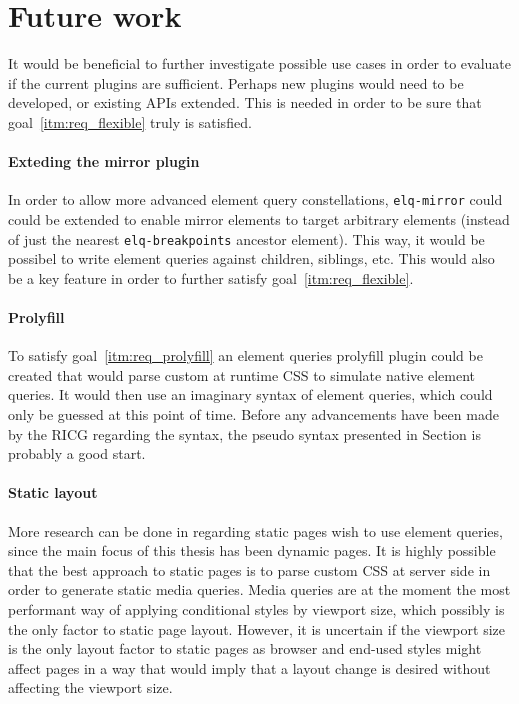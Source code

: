 \documentclass[a4paper,11pt]{kth-mag}
\newcommand{\code}[1]{\texttt{#1}}
\begin{document}
    \section{Future work}
      It would be beneficial to further investigate possible use cases in order to evaluate if the current plugins are sufficient.
      Perhaps new plugins would need to be developed, or existing \glspl{API} extended.
      This is needed in order to be sure that goal~\ref{itm:req_flexible} truly is satisfied.

      \paragraph{Exteding the mirror plugin}
      In order to allow more advanced element query constellations, \code{elq-mirror} could could be extended to enable mirror elements to target arbitrary elements (instead of just the nearest \code{elq-breakpoints} ancestor element).
      This way, it would be possibel to write element queries against children, siblings, etc.
      This would also be a key feature in order to further satisfy goal~\ref{itm:req_flexible}.

      \paragraph{Prolyfill}
      To satisfy goal~\ref{itm:req_prolyfill} an element queries prolyfill plugin could be created that would parse custom at runtime \gls{CSS} to simulate native element queries.
      It would then use an imaginary syntax of element queries, which could only be guessed at this point of time.
      Before any advancements have been made by the RICG regarding the syntax, the pseudo syntax presented in Section is probably a good start.

      \paragraph{Static layout}
      More research can be done in regarding static pages wish to use element queries, since the main focus of this thesis has been dynamic pages.
      It is highly possible that the best approach to static pages is to parse custom \gls{CSS} at server side in order to generate static media queries.
      Media queries are at the moment the most performant way of applying conditional styles by viewport size, which possibly is the only factor to static page layout.
      However, it is uncertain if the viewport size is the only layout factor to static pages as browser and end-used styles might affect pages in a way that would imply that a layout change is desired without affecting the viewport size.
\end{document}
